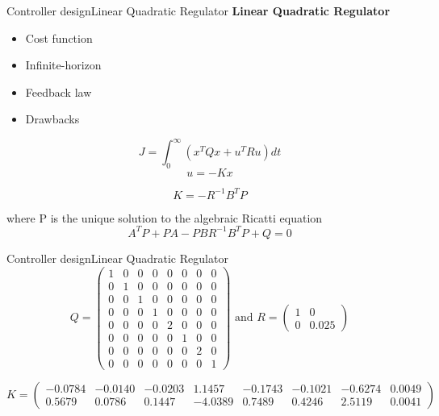\begin{frame}{Controller design}{Linear Quadratic Regulator}
	 \textbf{Linear Quadratic Regulator}
	\begin{itemize}
		\item Cost function
		\item Infinite-horizon 
		\item Feedback law
		\item Drawbacks
	\end{itemize}

\begin{equation} \label{eq:lqr_cost_fcn}
	J = \int_0^{\infty} \left(x^TQx + u^TRu\right)dt
\end{equation}
\begin{equation} \label{eq:lqr_cost_fcn}
	u = -Kx
\end{equation}

\begin{equation} \label{eq:lqr_K}
	K = -R^{-1}B^{T}P
\end{equation}

where P is the unique solution to the algebraic Ricatti equation
\begin{equation} \label{eq:ricatti}
	A^TP + PA - PBR^{-1}B^TP+Q = 0
\end{equation}

\end{frame}



\begin{frame}{Controller design}{Linear Quadratic Regulator}
\begin{equation}
	Q =
	\left(\begin{array}{cccccccc}
		1 & 0 & 0 & 0 & 0 & 0 & 0 & 0  \\
		0 & 1 & 0 & 0 & 0 & 0 & 0 & 0  \\
		0 & 0 & 1 & 0 & 0 & 0 & 0 & 0  \\
		0 & 0 & 0 & 1 & 0 & 0 & 0 & 0  \\
		0 & 0 & 0 & 0 & 2 & 0 & 0 & 0  \\
		0 & 0 & 0 & 0 & 0 & 1 & 0 & 0  \\
		0 & 0 & 0 & 0 & 0 & 0 & 2 & 0  \\
		0 & 0 & 0 & 0 & 0 & 0 & 0 & 1
	\end{array}\right)
	\text{  and  }
	R =
	\left(\begin{array}{cc}
		1 & 0  \\
		0 & 0.025
	\end{array}\right)
\end{equation}

\medskip

\begin{equation}
	K =
	\left(\begin{array}{cccccccccc}
		-0.0784 &  -0.0140 &  -0.0203 &   1.1457 &  -0.1743 &  -0.1021 &  -0.6274 &   0.0049 \\
		0.5679 &   0.0786 &   0.1447 &  -4.0389 &   0.7489 &   0.4246 &   2.5119 &   0.0041
	\end{array}\right)
\end{equation}
	
\end{frame}


